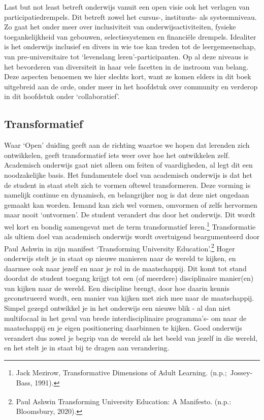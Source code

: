 \documentclass[empirical, authordate, ]{new-jote-article}
\begin{document}
	Last but not least betreft onderwijs vanuit een open visie ook het verlagen van participatiedrempels. Dit betreft zowel het cursus-, instituuts- als systeemniveau. Zo gaat het onder meer over inclusiviteit van onderwijsactiviteiten, fysieke toegankelijkheid van gebouwen, selectiesystemen en financiële drempels. Idealiter is het onderwijs inclusief en divers in wie toe kan treden tot de leergemeenschap, van pre-universitaire tot ‘levenslang leren'-participanten. Op al deze niveaus is het bevorderen van diversiteit in haar vele facetten in de instroom van belang. Deze aspecten benoemen we hier slechts kort, want ze komen elders in dit boek uitgebreid aan de orde, onder meer in het hoofdstuk over community en verderop in dit hoofdstuk onder ‘collaboratief'.



	\subsection{Transformatief}



	Waar ‘Open' duiding geeft aan de richting waartoe we hopen dat lerenden zich ontwikkelen, geeft transformatief iets weer over hoe het ontwikkelen zelf. Academisch onderwijs gaat niet alleen om feiten of vaardigheden, al legt dit een noodzakelijke basis. Het fundamentele doel van academisch onderwijs is dat het de student in staat stelt zich te vormen oftewel transformeren. Deze vorming is namelijk continue en dynamisch, en belangrijker nog is dat deze niet ongedaan gemaakt kan worden. Iemand kan zich wel vormen, omvormen of zelfs hervormen maar nooit ‘ontvormen'. De student verandert dus door het onderwijs. Dit wordt wel kort en bondig samengevat met de term transformatief leren.\footnote{Jack Mezirow, Transformative Dimensions of Adult Learning. (n.p.; Jossey-Bass, 1991).} Transformatie als ultiem doel van academisch onderwijs wordt overtuigend beargumenteerd door Paul Ashwin in zijn manifest ‘Transforming University Education'.\footnote{\textsuperscript{ }Paul Ashwin Transforming University Education: A Manifesto. (n.p.: Bloomsbury, 2020).} Hoger onderwijs stelt je in staat op nieuwe manieren naar de wereld te kijken, en daarmee ook naar jezelf en naar je rol in de maatschappij. Dit komt tot stand doordat de student toegang krijgt tot een (of meerdere) disciplinaire manier(en) van kijken naar de wereld. Een discipline brengt, door hoe daarin kennis geconstrueerd wordt, een manier van kijken met zich mee naar de maatschappij. Simpel gezegd ontwikkel je in het onderwijs een nieuwe blik - al dan niet multifocaal in het geval van brede interdisciplinaire programma's- om naar de maatschappij en je eigen positionering daarbinnen te kijken. Goed onderwijs verandert dus zowel je begrip van de wereld als het beeld van jezelf in die wereld, en het stelt je in staat bij te dragen aan verandering.
\end{document}
